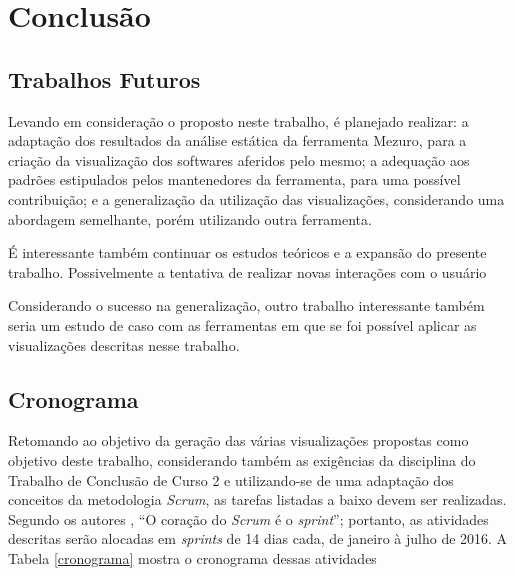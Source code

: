 \chapter[Conclusão]{Conclusão}

\section{Trabalhos Futuros}

Levando em consideração o proposto neste trabalho, é planejado realizar: a
adaptação dos resultados da análise estática da ferramenta Mezuro, para a
criação da visualização dos softwares aferidos pelo mesmo; a adequação aos
padrões estipulados pelos mantenedores da ferramenta, para uma possível
contribuição; e a generalização da utilização das visualizações, considerando uma
abordagem semelhante, porém utilizando outra ferramenta.

É interessante também continuar os estudos teóricos e a expansão do presente
trabalho. Possivelmente a tentativa de realizar novas interações com o usuário

Considerando o sucesso na generalização, outro trabalho interessante também
seria um estudo de caso com as ferramentas em que se foi possível aplicar as
visualizações descritas nesse trabalho.

\section{Cronograma}

Retomando ao objetivo da geração das várias visualizações propostas como
objetivo deste trabalho, considerando também as exigências da disciplina do
Trabalho de Conclusão de Curso 2 e utilizando-se de uma adaptação dos conceitos
da metodologia \textit{Scrum}, as tarefas listadas a baixo devem ser realizadas.
Segundo os autores , ``O coração do
\textit{Scrum} é o \textit{sprint}''; portanto, as atividades descritas serão
alocadas em \textit{sprints} de 14 dias cada, de janeiro à julho de 2016. A
Tabela \ref{cronograma} mostra o cronograma dessas atividades

